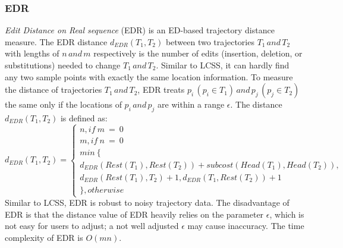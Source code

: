 \documentclass[a4paper, 12pt]{article}
\begin{document}
\subsubsection{EDR}
\textit{Edit Distance on Real sequence} (EDR) is an ED-based trajectory distance measure. The EDR distance $d_{EDR}(T_{1},T_{2})$ between two trajectories $T_{1}\,and\,T_{2}$ with lengths of $n\,and\,m$ respectively is the number of edits (insertion, deletion, or substitutions) needed to change $T_{1}\,and\,T_{2}$. Similar to LCSS, it can hardly find any two sample points with exactly the same location information. To measure the distance of trajectories $T_{1}\,and\,T_{2}$, EDR treats $p_{i}\,(p_{i} \in T_{1})\,and\,p_{j}\,(p_{j} \in T_{2})$ the same only if the locations of $p_{i}\,and\,p_{j}$ are within a range $\epsilon$. The distance $d_{EDR}(T_{1},T_{2})$ is defined as:
\begin{equation} \label{eq4}
    d_{EDR}(T_{1}, T_{2}) = \begin{cases}
                                n, if \:m\:=\:0 \\
                                m, if \:n\:=\:0 \\
                                min\:\{ \\ 
                                d_{EDR}(Rest(T_{1}),Rest(T_{2})) + subcost(Head(T_{1}), Head(T_{2})), \\
                                d_{EDR}(Rest(T_{1}), T_{2}) + 1, d_{EDR}(T_{1}, Rest(T_{2})) + 1 \\
                                \}, otherwise
                            \end{cases}
\end{equation}
Similar to LCSS, EDR is robust to noisy trajectory data. The disadvantage of EDR is that the distance value of EDR heavily relies on the parameter $\epsilon$, which is not easy for users to adjust; a not well adjusted $\epsilon$ may cause inaccuracy. The time complexity of EDR is $O(mn)$.
\end{document}
